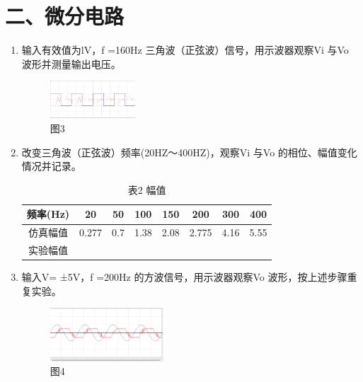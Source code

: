 \documentclass[a4paper,10pt,notitlepage]{article}
\begin{document}
\section*{二、微分电路}
\begin{enumerate}
	\item 输入有效值为lV，f =160Hz 三角波（正弦波）信号，用示波器观察Vi 与Vo
	波形并测量输出电压。
	\begin{figure}[h]
		\centering
		\includegraphics[width=0.3\textwidth]{4.png}
		\caption*{图3}
	\end{figure}
	\item 改变三角波（正弦波）频率(20HZ～400HZ)，观察Vi 与Vo 的相位、幅值变化
	情况并记录。
	\begin{table}[h]
		\centering
		\begin{tabular}{|c|c|c|c|c|c|c|c|}
			\hline
			频率(Hz) & 20 & 50 & 100 & 150 & 200 & 300 & 400 \\
			\hline
			仿真幅值 & 0.277 & 0.7 & 1.38 & 2.08 & 2.775 & 4.16 & 5.55\\
			\hline 
			实验幅值 & \qquad & \qquad & \qquad & \qquad & \qquad & \qquad &\qquad \\
			\hline
		\end{tabular}
		\caption*{表2 幅值}
	\end{table}
	\item 输入V= ±5V，f =200Hz 的方波信号，用示波器观察Vo 波形，按上述步骤重
	复实验。
	\begin{figure}[h]
		\centering
		\includegraphics[width=0.4\textwidth]{5.png}
		\caption*{图4}
		\end{figure}
\end{enumerate}
\end{document}
